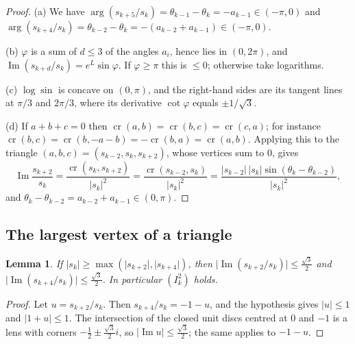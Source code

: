 \documentclass[11pt]{amsart}
\newtheorem{lemma}[theorem]{Lemma}
\theoremstyle{definition}
\theoremstyle{remark}
\newcommand{\cross}{\operatorname{cr}}
\renewcommand{\Im}{\operatorname{Im}}
\newcommand{\sq}{\tfrac{\sqrt3}{2}}
\begin{document}
\begin{proof}
(a) We have $\arg(s_{k+5}/s_k)=\theta_{k-1}-\theta_k=-a_{k-1}\in(-\pi,0)$ and $\arg(s_{k+4}/s_k)=\theta_{k-2}-\theta_k=-(a_{k-2}+a_{k-1})\in(-\pi,0)$.

(b) $\varphi$ is a sum of $d\le3$ of the angles $a_i$, hence lies in $(0,2\pi)$, and $\Im(s_{k+d}/s_k)=e^L\sin\varphi$. If $\varphi\ge\pi$ this is $\le0$; otherwise take logarithms.

(c) $\log\sin$ is concave on $(0,\pi)$, and the right-hand sides are its tangent lines at $\pi/3$ and $2\pi/3$, where its derivative $\cot\varphi$ equals $\pm1/\sqrt3$.

(d) If $a+b+c=0$ then $\cross(a,b)=\cross(b,c)=\cross(c,a)$; for instance $\cross(b,c)=\cross(b,-a-b)=-\cross(b,a)=\cross(a,b)$. Applying this to the triangle $(a,b,c)=(s_{k-2},s_k,s_{k+2})$, whose vertices sum to $0$, gives
\[
\Im\frac{s_{k+2}}{s_k}=\frac{\cross(s_k,s_{k+2})}{\lvert s_k\rvert^2}=\frac{\cross(s_{k-2},s_k)}{\lvert s_k\rvert^2}=\frac{\lvert s_{k-2}\rvert\,\lvert s_k\rvert\sin(\theta_k-\theta_{k-2})}{\lvert s_k\rvert^2},
\]
and $\theta_k-\theta_{k-2}=a_{k-2}+a_{k-1}\in(0,\pi)$.
\end{proof}

\subsection{The largest vertex of a triangle}

\begin{lemma}\label{lem:T}
If $\lvert s_k\rvert\ge\max(\lvert s_{k+2}\rvert,\lvert s_{k+4}\rvert)$, then $\lvert\Im(s_{k+2}/s_k)\rvert\le\sq$ and $\lvert\Im(s_{k+4}/s_k)\rvert\le\sq$. In particular $(I^2_k)$ holds.
\end{lemma}

\begin{proof}
Let $u=s_{k+2}/s_k$. Then $s_{k+4}/s_k=-1-u$, and the hypothesis gives $\lvert u\rvert\le1$ and $\lvert1+u\rvert\le1$. The intersection of the closed unit discs centred at $0$ and $-1$ is a lens with corners $-\frac12\pm\frac{\sqrt3}{2}i$, so $\lvert\Im u\rvert\le\sq$; the same applies to $-1-u$.
\end{proof}
\end{document}

